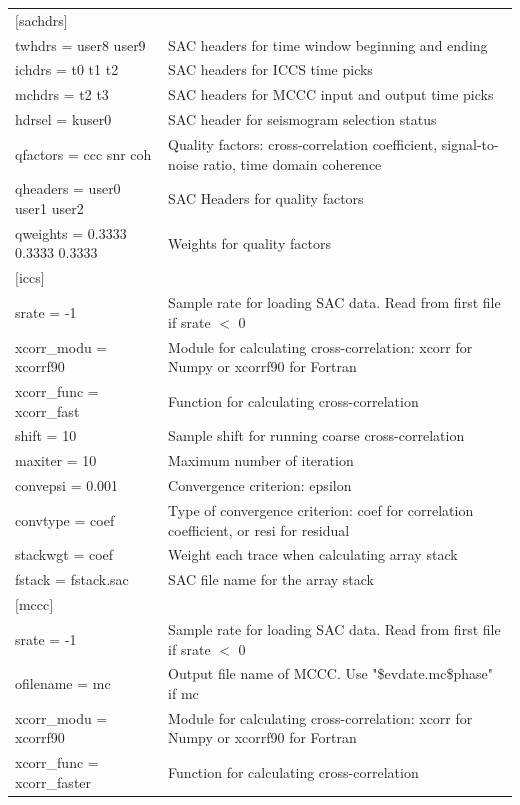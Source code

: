 \documentclass[12pt, titlepage]{article}
\begin{document}
\begin{table}[h!]
{\begin{tabular}{l l}
\cmidrule(l){1-1}
$[$sachdrs$]$			& \\
twhdrs = user8 	user9	& SAC headers for time window beginning and ending \\
ichdrs = t0 t1 t2			& SAC headers for ICCS time picks \\
mchdrs = t2 t3			& SAC headers for MCCC input and output time picks \\
hdrsel = kuser0			& SAC header for seismogram selection status \\
qfactors = ccc snr coh	& Quality factors: cross-correlation coefficient, signal-to-noise ratio, time domain coherence \\
qheaders = user0 user1 user2		& SAC Headers for quality factors \\
qweights = 0.3333 0.3333 0.3333	& Weights for quality factors \\
\cmidrule(l){1-1}
$[$iccs$]$				& \\
srate = -1 				& Sample rate for loading SAC data. Read from first file if srate $<$ 0 \\
xcorr\_modu = xcorrf90	& Module for calculating cross-correlation: xcorr for Numpy or xcorrf90 for Fortran \\
xcorr\_func = xcorr\_fast	& Function for calculating cross-correlation \\
shift = 10				& Sample shift for running coarse cross-correlation \\
maxiter = 10			& Maximum number of iteration \\
convepsi = 0.001		& Convergence criterion: epsilon \\
convtype = coef		& Type of convergence criterion: coef for correlation coefficient, or resi for residual \\
stackwgt = coef			& Weight each trace when calculating array stack \\
fstack = fstack.sac		& SAC file name for the array stack \\
\cmidrule(l){1-1}
$[$mccc$]$			& \\
srate = -1 				& Sample rate for loading SAC data. Read from first file if srate $<$ 0 \\
ofilename = mc			& Output file name of MCCC. Use "\$evdate.mc\$phase" if mc \\
xcorr\_modu = xcorrf90	& Module for calculating cross-correlation: xcorr for Numpy or xcorrf90 for Fortran \\
xcorr\_func = xcorr\_faster	& Function for calculating cross-correlation \\

\end{tabular}}
\end{table}
\end{document}
